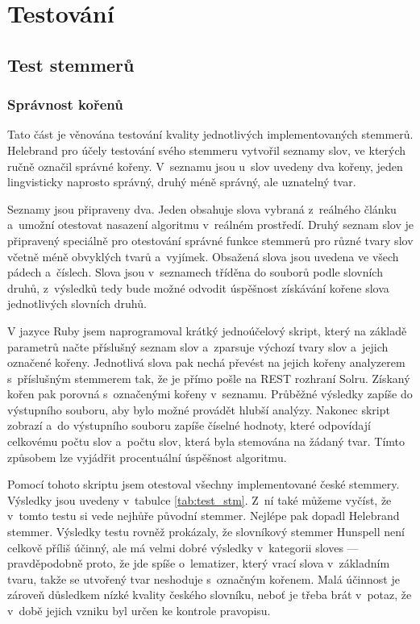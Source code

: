 \chapter{Testování} \label{testing}
\section{Test stemmerů}
\subsection{Správnost kořenů}
Tato část je věnována testování kvality jednotlivých implementovaných stemmerů. Helebrand pro účely testování svého stemmeru vytvořil seznamy slov, ve kterých ručně označil správné kořeny. V~seznamu jsou u~slov uvedeny dva kořeny, jeden lingvisticky naprosto správný, druhý méně správný, ale uznatelný tvar.

Seznamy jsou připraveny dva. Jeden obsahuje slova vybraná z~reálného článku a~umožní otestovat nasazení algoritmu v~reálném prostředí. Druhý seznam slov je připravený speciálně pro otestování správné funkce stemmerů pro různé tvary slov včetně méně obvyklých tvarů a~vyjímek. Obsažená slova jsou uvedena ve všech pádech a~číslech. Slova jsou v~seznamech tříděna do souborů podle slovních druhů, z~výsledků tedy bude možné odvodit úspěšnost získávání kořene slova jednotlivých slovních druhů.

V jazyce Ruby jsem naprogramoval krátký jednoúčelový skript, který na základě parametrů načte příslušný seznam slov a~zparsuje výchozí tvary slov a~jejich označené kořeny. Jednotlivá slova pak nechá převést na jejich kořeny analyzerem s~příslušným stemmerem tak, že je přímo pošle na REST rozhraní Solru. Získaný kořen pak porovná s~označenými kořeny v~seznamu. Průběžné výsledky zapíše do výstupního souboru, aby bylo možné provádět hlubší analýzy. Nakonec skript zobrazí a~do výstupního souboru zapíše číselné hodnoty, které odpovídají celkovému počtu slov a~počtu slov, která byla stemována na žádaný tvar. Tímto způsobem lze vyjádřit procentuální úspěšnost algoritmu.

Pomocí tohoto skriptu jsem otestoval všechny implementované české stemmery. Výsledky jsou uvedeny v~tabulce \ref{tab:test_stm}. Z~ní také můžeme vyčíst, že v~tomto testu si vede nejhůře původní stemmer. Nejlépe pak dopadl Helebrand stemmer. Výsledky testu rovněž prokázaly, že slovníkový stemmer Hunspell není celkově příliš účinný, ale má velmi dobré výsledky v~kategorii sloves --- pravděpodobně proto, že jde spíše o~lematizer, který vrací slova v~základním tvaru, takže se utvořený tvar neshoduje s~označným kořenem. Malá účinnost je zároveň důsledkem nízké kvality českého slovníku, neboť je třeba brát v~potaz, že v~době jejich vzniku byl určen ke kontrole pravopisu.

